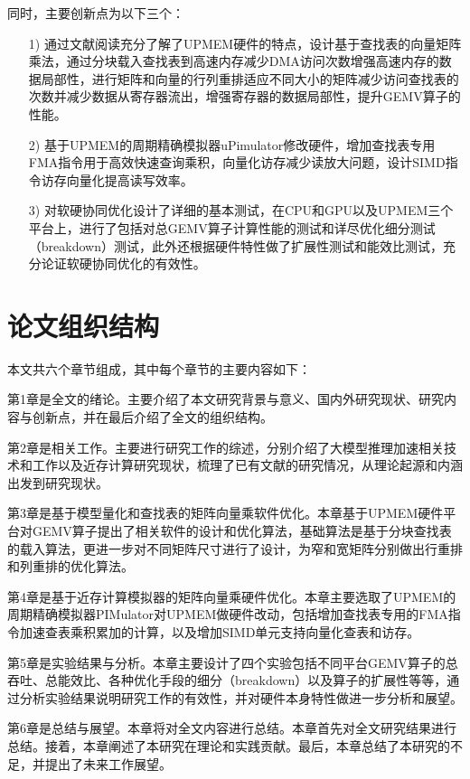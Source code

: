 同时，主要创新点为以下三个：
\begin{itemize}
	\item [1)] 
	通过文献阅读充分了解了UPMEM硬件的特点，设计基于查找表的向量矩阵乘法，通过分块载入查找表到高速内存减少DMA访问次数增强高速内存的数据局部性，进行矩阵和向量的行列重排适应不同大小的矩阵减少访问查找表的次数并减少数据从寄存器流出，增强寄存器的数据局部性，提升GEMV算子的性能。
	\item [2)]
	基于UPMEM的周期精确模拟器uPimulator修改硬件，增加查找表专用FMA指令用于高效快速查询乘积，向量化访存减少读放大问题，设计SIMD指令访存向量化提高读写效率。
    \item [3)]
	对软硬协同优化设计了详细的基本测试，在CPU和GPU以及UPMEM三个平台上，进行了包括对总GEMV算子计算性能的测试和详尽优化细分测试（breakdown）测试，此外还根据硬件特性做了扩展性测试和能效比测试，充分论证软硬协同优化的有效性。
\end{itemize}

\section{论文组织结构}
本文共六个章节组成，其中每个章节的主要内容如下：

第1章是全文的绪论。主要介绍了本文研究背景与意义、国内外研究现状、研究内容与创新点，并在最后介绍了全文的组织结构。

第2章是相关工作。主要进行研究工作的综述，分别介绍了大模型推理加速相关技术和工作以及近存计算研究现状，梳理了已有文献的研究情况，从理论起源和内涵出发到研究现状。

第3章是基于模型量化和查找表的矩阵向量乘软件优化。本章基于UPMEM硬件平台对GEMV算子提出了相关软件的设计和优化算法，基础算法是基于分块查找表的载入算法，更进一步对不同矩阵尺寸进行了设计，为窄和宽矩阵分别做出行重排和列重排的优化算法。

第4章是基于近存计算模拟器的矩阵向量乘硬件优化。本章主要选取了UPMEM的周期精确模拟器PIMulator对UPMEM做硬件改动，包括增加查找表专用的FMA指令加速查表乘积累加的计算，以及增加SIMD单元支持向量化查表和访存。

第5章是实验结果与分析。本章主要设计了四个实验包括不同平台GEMV算子的总吞吐、总能效比、各种优化手段的细分（breakdown）以及算子的扩展性等等，通过分析实验结果说明研究工作的有效性，并对硬件本身特性做进一步分析和展望。

第6章是总结与展望。本章将对全文内容进行总结。本章首先对全文研究结果进行总结。接着，本章阐述了本研究在理论和实践贡献。最后，本章总结了本研究的不足，并提出了未来工作展望。
